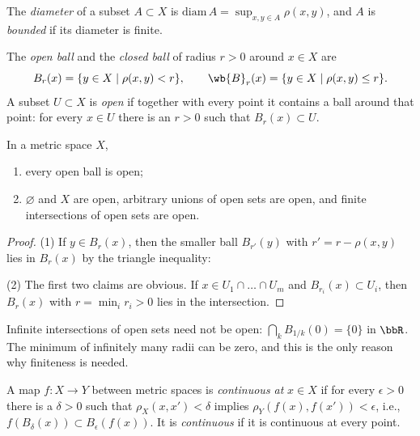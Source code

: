 The \emph{diameter} of a subset $A\subset X$ is $\mathrm{diam}\,A=\sup_{x,y\in A}\rho(x,y)$, and $A$ is \emph{bounded} if its diameter is finite.

\begin{defn}
    The \emph{open ball} and the \emph{closed ball} of radius $r>0$ around $x\in X$ are
    \[B_r(x)=\{y\in X\mid\rho(x,y)<r\},\qquad \wb{B}_r(x)=\{y\in X\mid\rho(x,y)\leq r\}.\]
    A subset $U\subset X$ is \emph{open} if together with every point it contains a ball around that point: for every $x\in U$ there is an $r>0$ such that $B_r(x)\subset U$.
\end{defn}

\begin{prop}\label{prop metric open sets}
    In a metric space $X$,
    \begin{enumerate}
        \item every open ball is open;
        \item $\varnothing$ and $X$ are open, arbitrary unions of open sets are open, and finite intersections of open sets are open.
    \end{enumerate}
\end{prop}
\begin{proof}
    (1) If $y\in B_r(x)$, then the smaller ball $B_{r'}(y)$ with $r'=r-\rho(x,y)$ lies in $B_r(x)$ by the triangle inequality:
    \begin{nscenter}
    \end{nscenter}
    (2) The first two claims are obvious. If $x\in U_1\cap\ldots\cap U_m$ and $B_{r_i}(x)\subset U_i$, then $B_r(x)$ with $r=\min_i r_i>0$ lies in the intersection.
\end{proof}
Infinite intersections of open sets need not be open: $\bigcap_{k}B_{1/k}(0)=\{0\}$ in $\bbR$. The minimum of infinitely many radii can be zero, and this is the only reason why finiteness is needed.

\begin{defn}[Continuity]
    A map $f:X\to Y$ between metric spaces is \emph{continuous at} $x\in X$ if for every $\epsilon>0$ there is a $\delta>0$ such that $\rho_X(x,x')<\delta$ implies $\rho_Y(f(x),f(x'))<\epsilon$, i.e., $f(B_\delta(x))\subset B_\epsilon(f(x))$. It is \emph{continuous} if it is continuous at every point.
\end{defn}

